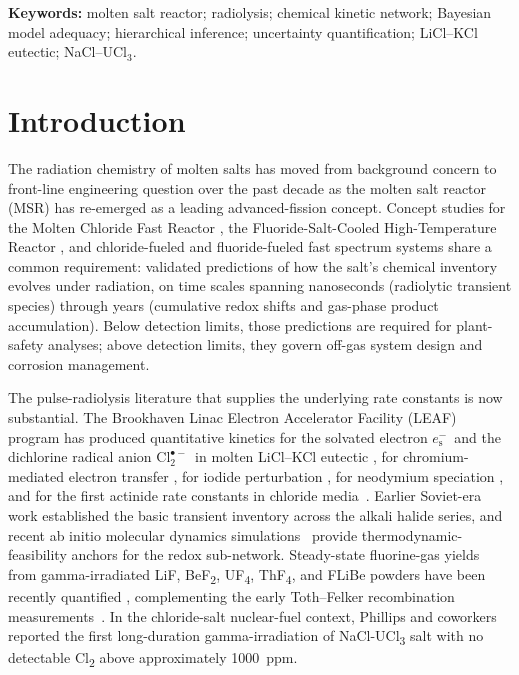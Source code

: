 \documentclass[12pt]{article}
\theoremstyle{plain}
\theoremstyle{definition}
\theoremstyle{remark}
\newcommand{\eS}{\ensuremath{e_{\mathrm{s}}^{-}}\xspace}
\newcommand{\Clt}{\ensuremath{\mathrm{Cl}_2^{\bullet-}}\xspace}
\begin{document}
\noindent\textbf{Keywords:}
molten salt reactor;
radiolysis;
chemical kinetic network;
Bayesian model adequacy;
hierarchical inference;
uncertainty quantification;
LiCl--KCl eutectic;
NaCl--UCl$_3$.

\bigskip

\section{Introduction}\label{sec:intro}

The radiation chemistry of molten salts has moved from background concern to
front-line engineering question over the past decade as the molten salt reactor
(MSR) has re-emerged as a leading advanced-fission concept.  Concept studies for
the Molten Chloride Fast Reactor \citep{TerraPower2021}, the Fluoride-Salt-Cooled
High-Temperature Reactor \citep{Forsberg2020}, and chloride-fueled and
fluoride-fueled fast spectrum systems share a common requirement:  validated
predictions of how the salt's chemical inventory evolves under
radiation, on time scales spanning nanoseconds (radiolytic transient species)
through years (cumulative redox shifts and gas-phase product accumulation).
Below detection limits, those predictions are required for plant-safety
analyses; above detection limits, they govern off-gas system design and
corrosion management.

The pulse-radiolysis literature that supplies the underlying rate constants is
now substantial.  The Brookhaven Linac Electron Accelerator Facility (LEAF)
program has produced quantitative kinetics for the solvated electron
\eS\ and the dichlorine radical anion \Clt\ in molten LiCl--KCl eutectic
\citep{Iwamatsu2022}, for chromium-mediated electron transfer
\citep{Iwamatsu2026}, for iodide perturbation \citep{Conrad2023}, for
neodymium speciation \citep{CastroBaldivieso2026}, and for the first
actinide rate constants in chloride media~\citep{Rotermund2024}.
Earlier Soviet-era work \citep{Pikaev1982,Makarov1982,Hagiwara1987}
established the basic transient inventory across the alkali halide series,
and recent ab initio molecular dynamics simulations~\citep{KristoffersenMetiu2018}
provide thermodynamic-feasibility anchors for the redox sub-network.
Steady-state fluorine-gas yields from gamma-irradiated LiF, BeF\textsubscript{2},
UF\textsubscript{4}, ThF\textsubscript{4}, and FLiBe powders have been recently
quantified \citep{Davis2022}, complementing the early Toth--Felker recombination
measurements~\citep{Toth1990}.  In the chloride-salt nuclear-fuel context,
Phillips and coworkers \citep{Phillips2022} reported the first long-duration
gamma-irradiation of \mbox{NaCl-UCl\textsubscript{3}} salt with no detectable
Cl\textsubscript{2} above approximately \SI{1000}{ppm}.
\end{document}
